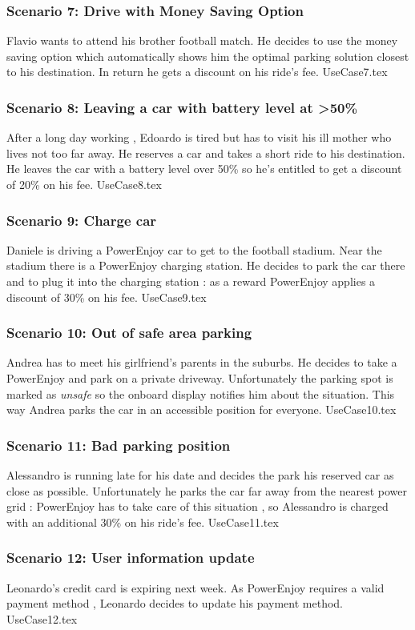 \documentclass[12pt]{article}
\begin{document}
		\subsubsection{Scenario 7: Drive with Money Saving Option}
		Flavio wants to attend his brother football match. He decides to use the money saving 
		option which automatically shows him the optimal parking solution closest to his destination.
		In return he gets a discount on his ride's fee.
		\FloatBarrier
		{UseCase7.tex}
		\newpage
		
		\subsubsection{Scenario 8: Leaving a car with battery level at \textgreater 50\%}
		After a long day working , Edoardo is tired but has to visit his ill mother who lives not too
		far away. He reserves a car and takes a short ride to his destination. He leaves the car with
		a battery level over 50\% so he's entitled to get a discount of 20\% on his fee.
		\FloatBarrier
		{UseCase8.tex}
		\newpage
		
		\subsubsection{Scenario 9: Charge car}
		Daniele is driving a PowerEnjoy car to get to the football stadium. Near the stadium there is a 
		PowerEnjoy charging station. He decides to park the car there and to plug it into the 
		charging station : as a reward PowerEnjoy applies a discount of 30\% on his fee.
		\FloatBarrier
		{UseCase9.tex}
		\newpage
		
		\subsubsection{Scenario 10: Out of safe area parking}
		Andrea has to meet his girlfriend's parents in the suburbs. He decides to take a PowerEnjoy
		and park on a private driveway. Unfortunately the parking spot is marked as \emph{unsafe} so 	
		the onboard  display notifies him about the situation. This way Andrea parks the car in an
		accessible position for everyone.
		\FloatBarrier
		{UseCase10.tex}
		\newpage
		
		\subsubsection{Scenario 11: Bad parking position}
		Alessandro is running late for his date and decides the park his reserved car as close as 
		possible. Unfortunately he parks the car far away from the nearest power grid : PowerEnjoy 
		has to take care of this situation , so Alessandro is charged with an additional 30\% on his
		ride's fee.
		\FloatBarrier
		{UseCase11.tex}
		\newpage
		
		\subsubsection{Scenario 12: User information update}
		Leonardo's credit card is expiring next week. As PowerEnjoy requires a valid payment method ,
		Leonardo decides to update his payment method.
		\FloatBarrier
		{UseCase12.tex}
		\newpage
		
		
\end{document}
